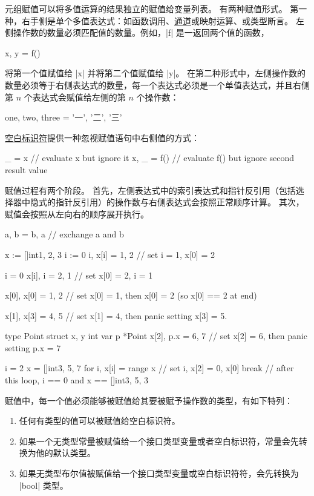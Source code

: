 元组赋值可以将多值运算的结果独立的赋值给变量列表。
有两种赋值形式。
第一种，右手侧是单个多值表达式：如函数调用、\hyperref[sec:channel type]{通道}或映射运算、或类型断言。
左侧操作数的数量必须匹配值的数量。例如，\gocode|f| 是一返回两个值的函数，
\begin{golang}
x, y = f()
\end{golang}
将第一个值赋值给 \code|x| 并将第二个值赋值给 \code|y|。
在第二种形式中，左侧操作数的数量必须等于右侧表达式的数量，每一个表达式必须是一个单值表达式，并且右侧第 $n$ 个表达式会赋值给左侧的第 $n$ 个操作数：
\begin{golang}
one, two, three = '一', '二', '三'
\end{golang}

\hyperref[sec:blank identifier]{空白标识符}提供一种忽视赋值语句中右侧值的方式：
\begin{golang}
_ = x       // evaluate x but ignore it
x, _ = f()  // evaluate f() but ignore second result value
\end{golang}

赋值过程有两个阶段。
首先，左侧表达式中的索引表达式和指针反引用（包括选择器中隐式的指针反引用）的操作数与右侧表达式会按照正常顺序计算。
其次，赋值会按照从左向右的顺序展开执行。
\begin{golang}
a, b = b, a  // exchange a and b

x := []int{1, 2, 3}
i := 0
i, x[i] = 1, 2  // set i = 1, x[0] = 2

i = 0
x[i], i = 2, 1  // set x[0] = 2, i = 1

x[0], x[0] = 1, 2  // set x[0] = 1, then x[0] = 2 (so x[0] == 2 at end)

x[1], x[3] = 4, 5  // set x[1] = 4, then panic setting x[3] = 5.

type Point struct { x, y int }
var p *Point
x[2], p.x = 6, 7  // set x[2] = 6, then panic setting p.x = 7

i = 2
x = []int{3, 5, 7}
for i, x[i] = range x {  // set i, x[2] = 0, x[0]
	break
}
// after this loop, i == 0 and x == []int{3, 5, 3}
\end{golang}

赋值中，每一个值必须能够被赋值给其要被赋予操作数的类型，有如下特列：
\begin{enumerate}
\item 任何有类型的值可以被赋值给空白标识符。
\item 如果一个无类型常量被赋值给一个接口类型变量或者空白标识符，常量会先转换为他的默认类型。
\item 如果无类型布尔值被赋值给一个接口类型变量或空白标识符符，会先转换为 \code|bool| 类型。
\end{enumerate}

